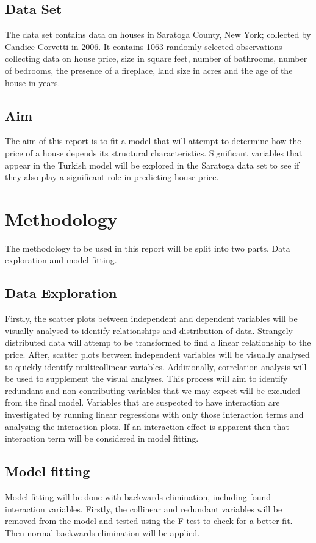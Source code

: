 \documentclass[10pt,A4,makeidx]{article}
\begin{document}
  \subsection{Data Set}
  The data set contains data on houses in Saratoga County, New York; collected by
  Candice Corvetti in 2006. It contains 1063 randomly selected observations collecting
  data on house price, size in square feet, number of bathrooms, number of bedrooms,
  the presence of a fireplace, land size in acres and the age of the house in years.
  
  \subsection{Aim}
  The aim of this report is to fit a model that will attempt to determine how 
  the price of a house depends its structural characteristics. Significant 
  variables that appear in the Turkish model will be explored in the Saratoga 
  data set to see if they also play a significant role in predicting house price.

\section{Methodology}
The methodology to be used in this report will be split into two parts. Data
exploration and model fitting.
  \subsection{Data Exploration}
  Firstly, the scatter plots between independent and dependent variables will be 
  visually analysed to identify relationships and distribution of data. Strangely
  distributed data will attemp to be transformed to find a linear relationship to 
  the price. After, scatter plots between independent variables will be visually analysed to quickly 
  identify multicollinear variables. Additionally, correlation analysis will be used to 
  supplement the visual analyses. This process will aim to identify redundant and 
  non-contributing variables that we may expect will be excluded from the 
  final model.  
  Variables that are suspected to have interaction are investigated by running linear 
  regressions with only those interaction terms and analysing the interaction plots.
  If an interaction effect is apparent then that interaction term will be considered
  in model fitting.
  \subsection{Model fitting}
  Model fitting will be done with backwards elimination, including found interaction 
  variables. Firstly, the collinear and redundant variables will be removed from the model and 
  tested using the F-test to check for a better fit. Then normal backwards elimination 
  will be applied.
\end{document}
